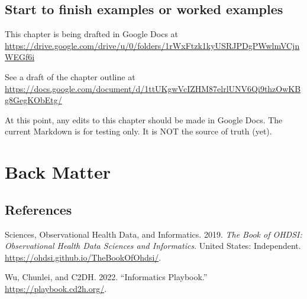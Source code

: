 \documentclass[
  letterpaper,
  DIV=11,
  numbers=noendperiod]{scrreprt}
\newlength{\cslhangindent}
\newlength{\cslentryspacingunit} %
\newenvironment{CSLReferences}[2] %
 {%
  \setlength{\parindent}{0pt}
  \ifodd #1
  \let\oldpar\par
  \def\par{\hangindent=\cslhangindent\oldpar}
  \fi
  \setlength{\parskip}{#2\cslentryspacingunit}
 }%
 {}
\begin{document}
\hypertarget{sec-example}{%
\chapter{Start to finish examples or worked
examples}\label{sec-example}}

\begin{tcolorbox}[enhanced jigsaw, rightrule=.15mm, colback=white, leftrule=.75mm, breakable, left=2mm, bottomtitle=1mm, opacityback=0, toprule=.15mm, colframe=quarto-callout-note-color-frame, titlerule=0mm, toptitle=1mm, coltitle=black, title=\textcolor{quarto-callout-note-color}{\faInfo}\hspace{0.5em}{Note}, bottomrule=.15mm, arc=.35mm, opacitybacktitle=0.6, colbacktitle=quarto-callout-note-color!10!white]

This chapter is being drafted in Google Docs at
\url{https://drive.google.com/drive/u/0/folders/1rWxFtzk1kyUSRJPDgPWwlmVCjnWEGf6i}

See a draft of the chapter outline at
\url{https://docs.google.com/document/d/1ttUKgwVcIZHM87elrlUNV6Qi9thzOwKBg8GegKObEtg/}

\end{tcolorbox}

\begin{tcolorbox}[enhanced jigsaw, rightrule=.15mm, colback=white, leftrule=.75mm, breakable, left=2mm, bottomtitle=1mm, opacityback=0, toprule=.15mm, colframe=quarto-callout-warning-color-frame, titlerule=0mm, toptitle=1mm, coltitle=black, title=\textcolor{quarto-callout-warning-color}{\faExclamationTriangle}\hspace{0.5em}{Warning}, bottomrule=.15mm, arc=.35mm, opacitybacktitle=0.6, colbacktitle=quarto-callout-warning-color!10!white]

At this point, any edits to this chapter should be made in Google Docs.
The current Markdown is for testing only. It is NOT the source of truth
(yet).

\end{tcolorbox}

\part{Back Matter}

\hypertarget{references}{%
\chapter*{References}\label{references}}


\hypertarget{refs}{}
\begin{CSLReferences}{1}{0}
\leavevmode{}%
Sciences, Observational Health Data, and Informatics. 2019. \emph{The
Book of OHDSI: Observational Health Data Sciences and Informatics}.
United States: Independent.
\url{https://ohdsi.github.io/TheBookOfOhdsi/}.

\leavevmode{}%
Wu, Chunlei, and C2DH. 2022. {``Informatics Playbook.''}
\url{https://playbook.cd2h.org/}.

\end{CSLReferences}
\end{document}
